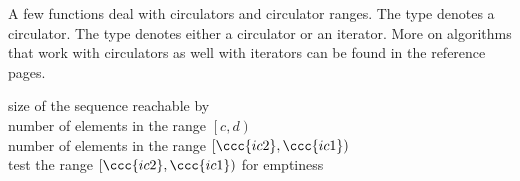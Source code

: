 A few functions deal with circulators and circulator ranges. The type
 denotes a circulator. The type  denotes either a circulator
or an iterator. More on algorithms that work with circulators as well with
iterators can be found in the reference pages.


\begin{tabbing}
   \>
      size of the sequence reachable by \\
   \>
      number of elements in the range $\left[c, d\right)$ \\
   \>
      number of elements in the range $\left[\ccc{ic2}, \ccc{ic1}\right)$ \\
   \>
      test the range $\left[\ccc{ic2}, \ccc{ic1}\right)$ for emptiness
\end{tabbing}

\gdef\lciIfHtmlClassLinks{\lcTrue}
\gdef\lciIfHtmlRefLinks{\lcTrue}
\gdef\lciIfHtmlLinks{\lcTrue}


